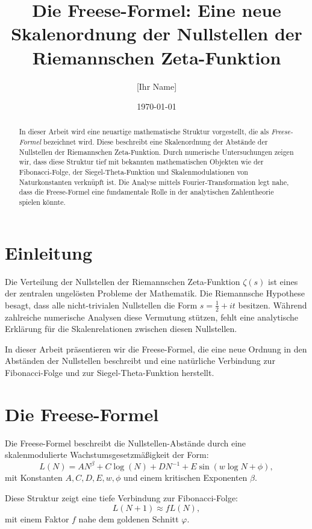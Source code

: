 \documentclass{article}
\title{Die Freese-Formel: Eine neue Skalenordnung der Nullstellen der Riemannschen Zeta-Funktion}
\author{[Ihr Name]}
\date{\today}
\begin{document}
\maketitle

\begin{abstract}
In dieser Arbeit wird eine neuartige mathematische Struktur vorgestellt, die als \textit{Freese-Formel} bezeichnet wird. Diese beschreibt eine Skalenordnung der Abstände der Nullstellen der Riemannschen Zeta-Funktion. Durch numerische Untersuchungen zeigen wir, dass diese Struktur tief mit bekannten mathematischen Objekten wie der Fibonacci-Folge, der Siegel-Theta-Funktion und Skalenmodulationen von Naturkonstanten verknüpft ist. Die Analyse mittels Fourier-Transformation legt nahe, dass die Freese-Formel eine fundamentale Rolle in der analytischen Zahlentheorie spielen könnte. 
\end{abstract}

\section{Einleitung}
Die Verteilung der Nullstellen der Riemannschen Zeta-Funktion $\zeta(s)$ ist eines der zentralen ungelösten Probleme der Mathematik. Die Riemannsche Hypothese besagt, dass alle nicht-trivialen Nullstellen die Form $s = \frac{1}{2} + i t$ besitzen. Während zahlreiche numerische Analysen diese Vermutung stützen, fehlt eine analytische Erklärung für die Skalenrelationen zwischen diesen Nullstellen. 

In dieser Arbeit präsentieren wir die Freese-Formel, die eine neue Ordnung in den Abständen der Nullstellen beschreibt und eine natürliche Verbindung zur Fibonacci-Folge und zur Siegel-Theta-Funktion herstellt.

\section{Die Freese-Formel}
Die Freese-Formel beschreibt die Nullstellen-Abstände durch eine skalenmodulierte Wachstumsgesetzmäßigkeit der Form:
\begin{equation}
    L(N) = A N^{\beta} + C \log(N) + D N^{-1} + E \sin(w \log N + \phi),
\end{equation}
mit Konstanten $A, C, D, E, w, \phi$ und einem kritischen Exponenten $\beta$.

Diese Struktur zeigt eine tiefe Verbindung zur Fibonacci-Folge:
\begin{equation}
    L(N+1) \approx f L(N),
\end{equation}
mit einem Faktor $f$ nahe dem goldenen Schnitt $\varphi$.
\end{document}
